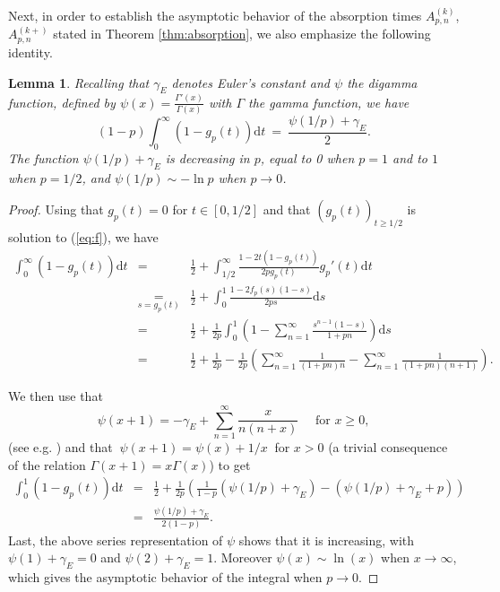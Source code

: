 \documentclass[a4, 11pt]{article}
\numberwithin{equation}{section}
\theoremstyle{plain}
\newtheorem{lemma}[theorem]{Lemma}
\theoremstyle{definition}
\theoremstyle{remark}
\begin{document}
Next, in order to establish the asymptotic behavior of the absorption times $A^{(k)}_{p,n}$, $A^{(k+)}_{p,n}$ stated in Theorem \ref{thm:absorption}, we also emphasize the following identity.


\begin{lemma}
\label{lem:identintegral}
Recalling that $\gamma_E$ denotes Euler's constant and $\psi$ the digamma function, defined by $\psi(x)=\frac{\Gamma'(x)}{\Gamma(x)}$ with $\Gamma$ the gamma function, we have
$$
(1-p)\int_0^{\infty} (1-g_p(t)) \mathrm dt ~ = ~ \frac{\psi(1/p) +\gamma_E}{2}.
$$
The function $\psi(1/p) +\gamma_E$ is decreasing in $p$, equal to 0 when $p=1$ and to $1$ when $p=1/2$, and $\psi(1/p) \sim -\ln p$ when $p \rightarrow 0$.
\end{lemma}

\begin{proof} Using that $g_p(t)=0$ for $t\in [0,1/2]$ and that $(g_p(t))_{t\geq 1/2}$ is solution to (\ref{eq:f}), we have
\begin{eqnarray*}
\int_0^{\infty} (1-g_p(t)) \mathrm dt&=&\frac{1}{2}+\int_{1/2}^{\infty} \frac{1-2t(1-g_p(t))}{2pg_p(t)} g_p'(t) \mathrm dt \\
&\underset{s=g_p(t)}=& \frac{1}{2}+ \int_0^1  \frac{1-2f_p(s)(1-s)}{2ps} \mathrm ds \\
&=& \frac{1}{2}+\frac{1}{2p} \int_0^1 \left(1-  \sum_{n=1}^{\infty} \frac{s^{n-1}(1-s)}{1+pn} \right)\mathrm ds \\
&=&  \frac{1}{2}+\frac{1}{2p}- \frac{1}{2p} \left(\sum_{n=1}^{\infty} \frac{1}{(1+pn)n}-\sum_{n=1}^{\infty} \frac{1}{(1+pn)(n+1)} \right).
\end{eqnarray*}

We then use that 
$$
\psi(x+1)=-\gamma_E+\sum_{n=1}^{\infty} \frac{x}{n(n+x)} \quad \text{ for }x\geq 0,
$$
(see e.g. \cite{spouge94}) and that $~\psi(x+1)=\psi(x)+1/x~$ for $x>0$ (a trivial consequence of the relation $\Gamma(x+1)=x\Gamma(x)$) to get
\begin{eqnarray*}
\int_0^1 (1-g_p(t)) \mathrm dt&=& \frac{1}{2}+\frac{1}{2p}\left(\frac{1}{1-p}\left(\psi(1/p) +\gamma_E\right)-\left(\psi(1/p)+\gamma_E+p \right) \right) \\
&=&\frac{\psi(1/p)+\gamma_E}{2(1-p)}.
\end{eqnarray*}
Last, the above series representation of $\psi$ shows that it is increasing, with $\psi(1)+\gamma_E=0$ and $\psi(2)+\gamma_E=1$. Moreover $\psi(x) \sim \ln(x)$ when $x \rightarrow \infty$, which gives the asymptotic behavior of the integral when $p\rightarrow 0$.
\end{proof}
\end{document}
